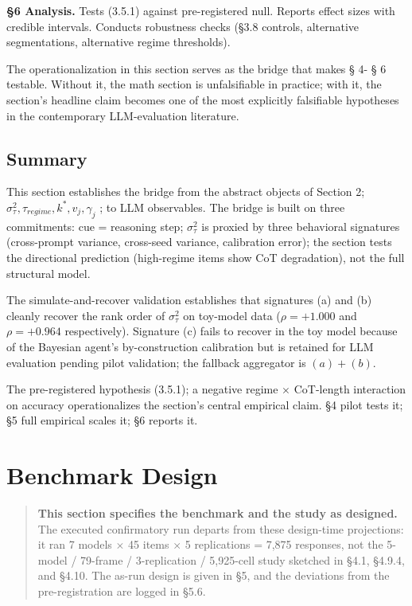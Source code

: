 \documentclass{article}
\begin{document}
\textbf{\S{}6 Analysis.} Tests (3.5.1) against pre-registered null. Reports
effect sizes with credible intervals. Conducts robustness checks (\S{}3.8
controls, alternative segmentations, alternative regime thresholds).

The operationalization in this section serves as the bridge that makes \S{}
4- \S{} 6 testable. Without it, the math section is unfalsifiable in
practice; with it, the section's headline claim becomes one of the most
explicitly falsifiable hypotheses in the contemporary LLM-evaluation
literature.

\subsection{Summary}\label{summary}

This section establishes the bridge from the abstract objects of Section 2; \(\sigma_{\tau}^{2},\tau_{regime},k^{*},v_{j},\gamma_{j}\) ; to LLM
observables. The bridge is built on three commitments: cue = reasoning
step; \(\sigma_{\tau}^{2}\) is proxied by three behavioral signatures
(cross-prompt variance, cross-seed variance, calibration error); the
section tests the directional prediction (high-regime items show CoT
degradation), not the full structural model.

The simulate-and-recover validation establishes that signatures (a) and
(b) cleanly recover the rank order of \(\sigma_{\tau}^{2}\) on toy-model
data (\(\rho = + 1.000\) and \(\rho = + 0.964\) respectively). Signature
(c) fails to recover in the toy model because of the Bayesian agent's
by-construction calibration but is retained for LLM evaluation pending
pilot validation; the fallback aggregator is \((a) + (b)\).

The pre-registered hypothesis (3.5.1); a negative regime \(\times\)
CoT-length interaction on accuracy operationalizes the section's central
empirical claim. \S{}4 pilot tests it; \S{}5 full empirical scales it; \S{}6
reports it.

\section{Benchmark Design}\label{chapter-4-benchmark-design}

\begin{quote}
\textbf{This section specifies the benchmark and the study as designed.}
The executed confirmatory run departs from these design-time
projections: it ran 7 models \ensuremath{\times} 45 items \ensuremath{\times} 5 replications = 7,875
responses, not the 5-model / 79-frame / 3-replication / 5,925-cell study
sketched in \S{}4.1, \S{}4.9.4, and \S{}4.10. The as-run design is given in \S{}5,
and the deviations from the pre-registration are logged in \S{}5.6.
\end{quote}
\end{document}
